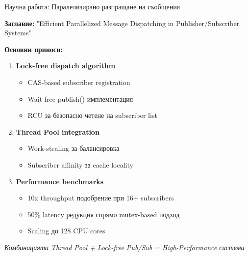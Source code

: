 \documentclass[aspectratio=169]{beamer}
\begin{document}
\begin{frame}{Научна работа: Паралелизирано разпращане на съобщения}

\textbf{Заглавие:} "Efficient Parallelized Message Dispatching in Publisher/Subscriber Systems"

\vspace{0.3cm}

\textbf{Основни приноси:}
\begin{enumerate}
    \item \textbf{Lock-free dispatch algorithm}
    \begin{itemize}
        \item CAS-based subscriber registration
        \item Wait-free publish() имплементация
        \item RCU за безопасно четене на subscriber list
    \end{itemize}
    
    \item \textbf{Thread Pool integration}
    \begin{itemize}
        \item Work-stealing за балансировка
        \item Subscriber affinity за cache locality
    \end{itemize}
    
    \item \textbf{Performance benchmarks}
    \begin{itemize}
        \item 10x throughput подобрение при 16+ subscribers
        \item 50\% latency редукция спрямо mutex-based подход
        \item Scaling до 128 CPU cores
    \end{itemize}
\end{enumerate}

\vspace{0.3cm}
\centering
\textit{Комбинацията Thread Pool + Lock-free Pub/Sub = High-Performance системи}
\end{frame}
\end{document}
